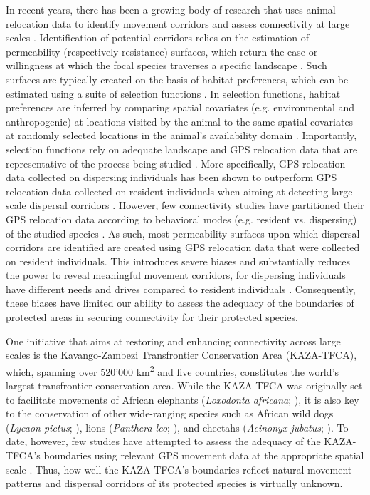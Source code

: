 \documentclass[abstract=on,10pt,a4paper,bibliography=totocnumbered]{article}
\begin{document}
In recent years, there has been a growing body of research that uses animal
relocation data to identify movement corridors and assess connectivity at large
scales \citep{Chetkiewicz.2006, Doerr.2011, Squires.2013, Elliot.2014,
Benz.2016, Osipova.2019}. Identification of potential corridors relies on the
estimation of permeability (respectively resistance) surfaces, which return the
ease or willingness at which the focal species traverses a specific landscape
\citep{Sawyer.2011}. Such surfaces are typically created on the basis of habitat
preferences, which can be estimated using a suite of selection functions
\citep{Boyce.2002, Fortin.2005, Cushman.2010}. In selection functions, habitat
preferences are inferred by comparing spatial covariates (e.g. environmental and
anthropogenic) at locations visited by the animal to the same spatial covariates
at randomly selected locations in the animal's availability domain
\citep{Zeller.2012, Thurfjell.2014}. Importantly, selection functions rely on
adequate landscape and GPS relocation data that are representative of the
process being studied \citep{Diniz.2020}. More specifically, GPS relocation data
collected on dispersing individuals has been shown to outperform GPS relocation
data collected on resident individuals when aiming at detecting large scale
dispersal corridors \citep{Elliot.2014, Diniz.2020}. However, few connectivity
studies have partitioned their GPS relocation data according to behavioral modes
(e.g. resident vs. dispersing) of the studied species \citep{Wilson.2012,
Vasudev.2015}. As such, most permeability surfaces upon which dispersal
corridors are identified are created using GPS relocation data that were
collected on resident individuals. This introduces severe biases and
substantially reduces the power to reveal meaningful movement corridors, for
dispersing individuals have different needs and drives compared to resident
individuals \citep{Killeen.2014, Elliot.2014, Cozzi.2020}. Consequently, these
biases have limited our ability to assess the adequacy of the boundaries of
protected areas in securing connectivity for their protected species.

One initiative that aims at restoring and enhancing connectivity across large
scales is the Kavango-Zambezi Transfrontier Conservation Area (KAZA-TFCA),
which, spanning over 520'000 km\textsuperscript{2} and five countries,
constitutes the world's largest transfrontier conservation area. While the
KAZA-TFCA was originally set to facilitate movements of African elephants
(\textit{Loxodonta africana}; \citealp{Tshipa.2017}), it is also key to the
conservation of other wide-ranging species such as African wild dogs
(\textit{Lycaon pictus}; \citealp{Woodroffe.2012, Cozzi.2020}), lions
(\textit{Panthera leo}; \citealp{Elliot.2014, Cushman.2018}), and cheetahs
(\textit{Acinonyx jubatus}; \citealp{Weise.2017}). To date, however, few studies
have attempted to assess the adequacy of the KAZA-TFCA's boundaries using
relevant GPS movement data at the appropriate spatial scale \citep{Elliot.2014,
Tshipa.2017}. Thus, how well the KAZA-TFCA's boundaries reflect natural movement
patterns and dispersal corridors of its protected species is virtually unknown.
\end{document}
